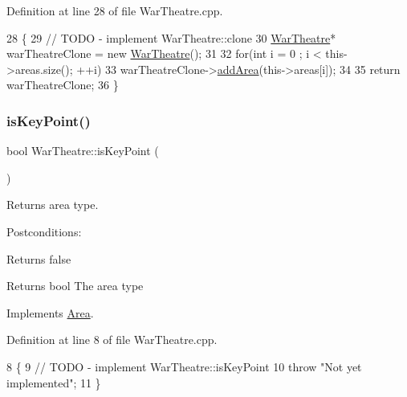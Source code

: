 Definition at line 28 of file War\+Theatre.\+cpp.


\begin{DoxyCode}
28                         \{
29     \textcolor{comment}{// TODO - implement WarTheatre::clone}
30  \hyperlink{classWarTheatre}{WarTheatre}* warTheatreClone = \textcolor{keyword}{new} \hyperlink{classWarTheatre_aeac00db856afa4a7223d265093c7eca2}{WarTheatre}();
31 
32  \textcolor{keywordflow}{for}(\textcolor{keywordtype}{int} i = 0 ; i < this->areas.size(); ++i)
33     warTheatreClone->\hyperlink{classWarTheatre_adc871336a6bf1263216b0f87da04cc57}{addArea}(this->areas[i]);
34 
35     \textcolor{keywordflow}{return} warTheatreClone;
36 \}
\end{DoxyCode}
\mbox{\label{classWarTheatre_a01845ca2cc01367101b2884f2902bf88}} 
\subsubsection{\texorpdfstring{is\+Key\+Point()}{isKeyPoint()}}
{\footnotesize\ttfamily bool War\+Theatre\+::is\+Key\+Point (\begin{DoxyParamCaption}{ }\end{DoxyParamCaption})\hspace{0.3cm}{\ttfamily [virtual]}}



Returns area type. 

Postconditions\+:
\begin{DoxyItemize}
\item Returns false
\end{DoxyItemize}

\begin{DoxyReturn}{Returns}
bool The area type 
\end{DoxyReturn}


Implements \hyperlink{classArea}{Area}.



Definition at line 8 of file War\+Theatre.\+cpp.


\begin{DoxyCode}
8                             \{
9     \textcolor{comment}{// TODO - implement WarTheatre::isKeyPoint}
10     \textcolor{keywordflow}{throw} \textcolor{stringliteral}{"Not yet implemented"};
11 \}
\end{DoxyCode}
\mbox{\label{classWarTheatre_ab26cd475022390aefc1e4c6475e194ac}} 
